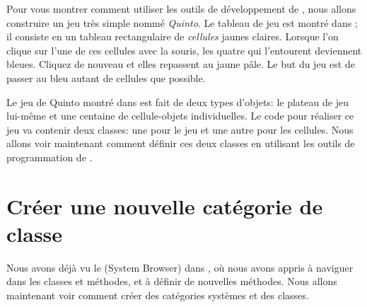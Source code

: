 \documentclass[a4paper,10pt,twoside]{book}
\begin{document}
Pour vous montrer comment utiliser les outils de développement de
\sq, nous allons construire un jeu très simple nommé
\emph{Quinto}.  Le tableau de jeu est montré dans
; il consiste en un tableau rectangulaire de
\emph{cellules} jaunes claires.  Lorsque l'on clique sur l'une de ces
cellules avec la souris, les quatre qui l'entourent deviennent
bleues. Cliquez de nouveau et elles repassent au jaune p\^ale. Le but du 
jeu est de passer au bleu autant de cellules que possible.

Le jeu de Quinto montré dans  est fait de deux types d'objets: le plateau de jeu lui-m\^eme et une centaine de cellule-objets individuelles. Le code \sq pour réaliser ce jeu va contenir deux classes: une pour le jeu et une autre pour les cellules.
Nous allons voir maintenant comment définir ces deux classes en utilisant les outils de programmation de \sq.

\section{Créer une nouvelle catégorie de classe}

Nous avons déjà vu le  (System Browser)
dans , o\`u nous avons appris à naviguer dans les classes
et méthodes, et à définir de nouvelles méthodes.
Nous allons maintenant voir comment créer des catégories systèmes et des classes.

\end{document}
